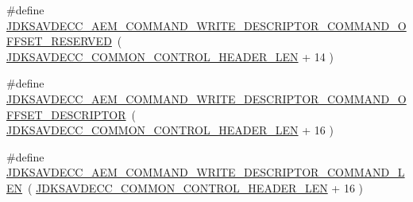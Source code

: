 \begin{DoxyCompactItemize}
\item 
\#define \hyperlink{group__command__write__descriptor_ga5656af336527cb1714da5dacea344e3b}{J\+D\+K\+S\+A\+V\+D\+E\+C\+C\+\_\+\+A\+E\+M\+\_\+\+C\+O\+M\+M\+A\+N\+D\+\_\+\+W\+R\+I\+T\+E\+\_\+\+D\+E\+S\+C\+R\+I\+P\+T\+O\+R\+\_\+\+C\+O\+M\+M\+A\+N\+D\+\_\+\+O\+F\+F\+S\+E\+T\+\_\+\+R\+E\+S\+E\+R\+V\+ED}~( \hyperlink{group__jdksavdecc__avtp__common__control__header_gaae84052886fb1bb42f3bc5f85b741dff}{J\+D\+K\+S\+A\+V\+D\+E\+C\+C\+\_\+\+C\+O\+M\+M\+O\+N\+\_\+\+C\+O\+N\+T\+R\+O\+L\+\_\+\+H\+E\+A\+D\+E\+R\+\_\+\+L\+EN} + 14 )
\item 
\#define \hyperlink{group__command__write__descriptor_ga9696afdfbb33dd5892ab5377e8e4db74}{J\+D\+K\+S\+A\+V\+D\+E\+C\+C\+\_\+\+A\+E\+M\+\_\+\+C\+O\+M\+M\+A\+N\+D\+\_\+\+W\+R\+I\+T\+E\+\_\+\+D\+E\+S\+C\+R\+I\+P\+T\+O\+R\+\_\+\+C\+O\+M\+M\+A\+N\+D\+\_\+\+O\+F\+F\+S\+E\+T\+\_\+\+D\+E\+S\+C\+R\+I\+P\+T\+OR}~( \hyperlink{group__jdksavdecc__avtp__common__control__header_gaae84052886fb1bb42f3bc5f85b741dff}{J\+D\+K\+S\+A\+V\+D\+E\+C\+C\+\_\+\+C\+O\+M\+M\+O\+N\+\_\+\+C\+O\+N\+T\+R\+O\+L\+\_\+\+H\+E\+A\+D\+E\+R\+\_\+\+L\+EN} + 16 )
\item 
\#define \hyperlink{group__command__write__descriptor_gadc606ecafdc18573d817f098cbebd26c}{J\+D\+K\+S\+A\+V\+D\+E\+C\+C\+\_\+\+A\+E\+M\+\_\+\+C\+O\+M\+M\+A\+N\+D\+\_\+\+W\+R\+I\+T\+E\+\_\+\+D\+E\+S\+C\+R\+I\+P\+T\+O\+R\+\_\+\+C\+O\+M\+M\+A\+N\+D\+\_\+\+L\+EN}~( \hyperlink{group__jdksavdecc__avtp__common__control__header_gaae84052886fb1bb42f3bc5f85b741dff}{J\+D\+K\+S\+A\+V\+D\+E\+C\+C\+\_\+\+C\+O\+M\+M\+O\+N\+\_\+\+C\+O\+N\+T\+R\+O\+L\+\_\+\+H\+E\+A\+D\+E\+R\+\_\+\+L\+EN} + 16 )
\end{DoxyCompactItemize}
